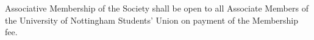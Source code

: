  Associative Membership of the Society shall be open to all Associate Members of the University of Nottingham Students' Union on payment of the Membership fee.\ \\